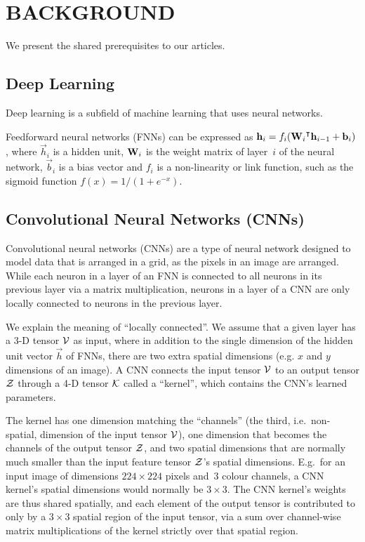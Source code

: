\chapter{BACKGROUND}

We present the shared prerequisites to our articles.


\section{Deep Learning}

Deep learning is a subfield of machine learning that uses neural
networks.

Feedforward neural networks (FNNs) can be expressed as
$\mathbf{h}_i = f_i({\mathbf{W}_i}^\intercal \mathbf{h}_{i - 1} + \mathbf{b}_i)$, where
$\vec{h}_i$ is a hidden unit, $\mathbf{W}_i$ is the weight matrix of layer~$i$ of
the neural network, $\vec{b}_i$ is a bias vector and $f_i$ is a non-linearity
or link function, such as the sigmoid function $f(x) = 1/(1 + e^{-x})$.


\section{Convolutional Neural Networks (CNNs)}

Convolutional neural networks (CNNs) are a type of neural network designed to
model data that is arranged in a grid, as the pixels in an image are arranged.
While each neuron in a layer of an FNN is connected to all neurons in its
previous layer via a matrix multiplication, neurons in a layer of a CNN are
only locally connected to neurons in the previous layer.

We explain the meaning of ``locally connected''. We assume that a given layer
has a 3-D tensor $\mathcal{V}$ as input, where in addition to the single dimension
of the hidden unit vector $\vec{h}$ of FNNs, there are two extra spatial
dimensions (e.g. $x$ and $y$ dimensions of an image).  A CNN connects the input
tensor $\mathcal{V}$ to an output tensor $\mathcal{Z}$ through a 4-D tensor
$\mathcal{K}$ called a ``kernel'', which contains the CNN's learned parameters.

The kernel has one dimension matching the ``channels'' (the third, i.e.\
non-spatial, dimension of the input tensor $\mathcal{V}$), one dimension that
becomes the channels of the output tensor $\mathcal{Z}$, and two spatial
dimensions that are normally much smaller than the input feature tensor
$\mathcal{Z}$'s spatial dimensions. E.g.\ for an input image of dimensions $224
\times 224$ pixels and~\num{3} colour channels, a CNN kernel's spatial
dimensions would normally be $3 \times 3$. The CNN kernel's weights are thus
shared spatially, and each element of the output tensor is contributed to only
by a $3 \times 3$ spatial region of the input tensor, via a sum over
channel-wise matrix multiplications of the kernel strictly over that spatial
region.

